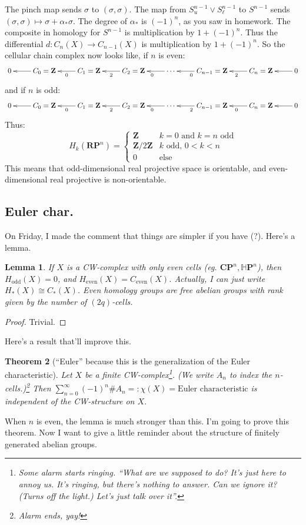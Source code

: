 \documentclass{amsart}
\theoremstyle{theorem}
\newtheorem{theorem}{Theorem}[section]
\newtheorem{lemma}[theorem]{Lemma}
\theoremstyle{definition}
\newcommand{\CP}{\mathbf{CP}}
\newcommand{\RP}{\mathbf{RP}}
\newcommand{\Z}{\mathbf Z}
\begin{document}
The pinch map sends $\sigma$ to $(\sigma,\sigma)$. The map from $S^{n-1}_u\vee S^{n-1}_\ell$ to $S^{n-1}$ sends $(\sigma,\sigma)\mapsto \sigma+\alpha_\ast\sigma$. The degree of $\alpha_\ast$ is $(-1)^n$, as you saw in homework. The composite in homology for $S^{n-1}$ is multiplication by $1+(-1)^n$. Thus the differential $d:C_n(X)\to C_{n-1}(X)$ is multiplication by $1+(-1)^n$. So the cellular chain complex now looks like, if $n$ is even:
\begin{equation*}
\xymatrix{0 & C_0=\Z\ar[l] & C_1=\Z\ar[l]^0 & C_2=\Z \ar[l]^2 & \cdots\ar[l]^0 & C_{n-1}=\Z\ar[l]^0 & C_n=\Z\ar[l]^2 & 0\ar[l]}
\end{equation*}
and if $n$ is odd:
\begin{equation*}
\xymatrix{0 & C_0=\Z\ar[l] & C_1=\Z\ar[l]^0 & C_2=\Z \ar[l]^2 & \cdots\ar[l]^0 & C_{n-1}=\Z\ar[l]^2 & C_n=\Z\ar[l]^0 & 0\ar[l]}
\end{equation*}
Thus:
\begin{equation*}
 H_k(\RP^n)=\begin{cases}
\Z & k=0\text{ and }k=n\text{ odd}\\
\Z/2\Z & k\text{ odd, }0<k<n\\
0 & \text{else}
\end{cases}
\end{equation*}
This means that odd-dimensional real projective space is orientable, and even-dimensional real projective is non-orientable.
\subsection{Euler char.}
On Friday, I made the comment that things are simpler if you have (?). Here's a lemma.
\begin{lemma}
If $X$ is a CW-complex with only even cells (eg. $\CP^n,\mathbb{H}\mathbf{P}^n$), then $ H_\text{odd}(X)=0$, and $ H_\text{even}(X)=C_\text{even}(X)$. Actually, I can just write $ H_\ast(X)\cong C_\ast(X)$. Even homology groups are free abelian groups with rank given by the number of $(2q)$-cells.
\end{lemma}
\begin{proof}
Trivial.
\end{proof}
Here's a result that'll improve this.
\begin{theorem}[``Euler'' because this is the generalization of the Euler characteristic]
Let $X$ be a finite CW-complex\footnote{Some alarm starts ringing. ``What are we supposed to do? It's just here to annoy us. It's ringing, but there's nothing to answer. Can we ignore it? (Turns off the light.) Let's just talk over it''.}. (We write $A_n$ to index the $n$-cells.)\footnote{Alarm ends, yay!} Then $\sum^\infty_{n=0}(-1)^n\# A_n=:\chi(X)=\text{Euler characteristic}$ is independent of the CW-structure on $X$. 
\end{theorem}
When $n$ is even, the lemma is much stronger than this. I'm going to prove this theorem. Now I want to give a little reminder about the structure of finitely generated abelian groups.
\end{document}
